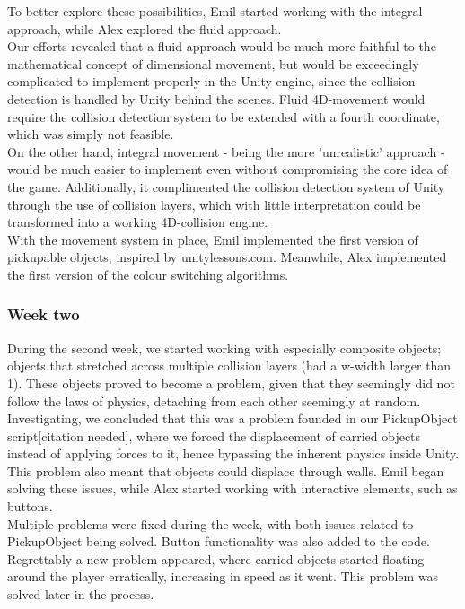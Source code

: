 To better explore these possibilities, Emil started working with the integral approach, while Alex explored the fluid approach.\\

Our efforts revealed that a fluid approach would be much more faithful to the mathematical concept of dimensional movement, but would be exceedingly complicated to implement properly in the Unity engine, since the collision detection is handled by Unity behind the scenes. Fluid 4D-movement would require the collision detection system to be extended with a fourth coordinate, which was simply not feasible.\\

On the other hand, integral movement - being the more 'unrealistic' approach - would be much easier to implement even without compromising the core idea of the game. Additionally, it complimented the collision detection system of Unity through the use of collision layers, which with little interpretation could be transformed into a working 4D-collision engine.\\

With the movement system in place, Emil implemented the first version of pickupable objects, inspired by unitylessons.com\cite{unityLessons}. Meanwhile, Alex implemented the first version of the colour switching algorithms.

\subsubsection{Week two}
During the second week, we started working with especially composite objects; objects that stretched across multiple collision layers (had a w-width larger than 1). These objects proved to become a problem, given that they seemingly did not follow the laws of physics, detaching from each other seemingly at random.\\

Investigating, we concluded that this was a problem founded in our PickupObject script[citation needed], where we forced the displacement of carried objects instead of applying forces to it, hence bypassing the inherent physics inside Unity. This problem also meant that objects could displace through walls. Emil began solving these issues, while Alex started working with interactive elements, such as buttons.\\

Multiple problems were fixed during the week, with both issues related to PickupObject being solved. Button functionality was also added to the code. Regrettably a new problem appeared, where carried objects started floating around the player erratically, increasing in speed as it went. This problem was solved later in the process.\\

